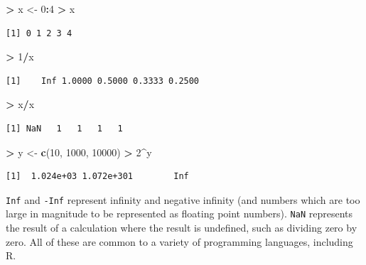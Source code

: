 \documentclass[]{krantz}
\makeatletter
\newenvironment{Shaded}{\begin{snugshade}}{\end{snugshade}}
\newcommand{\KeywordTok}[1]{\textcolor[rgb]{0.27,0.27,0.27}{\textbf{#1}}}
\newcommand{\DecValTok}[1]{\textcolor[rgb]{0.06,0.06,0.06}{#1}}
\newcommand{\StringTok}[1]{\textcolor[rgb]{0.5,0.5,0.5}{#1}}
\newcommand{\OperatorTok}[1]{\textcolor[rgb]{0.43,0.43,0.43}{\textbf{#1}}}
\newcommand{\NormalTok}[1]{#1}
\newenvironment{kframe}{%
\medskip{}
\setlength{\fboxsep}{.8em}
 \def\at@end@of@kframe{}%
 \ifinner\ifhmode%
  \def\at@end@of@kframe{\end{minipage}}%
  \begin{minipage}{\columnwidth}%
 \fi\fi%
 \def\FrameCommand##1{\hskip\@totalleftmargin \hskip-\fboxsep
 \colorbox{shadecolor}{##1}\hskip-\fboxsep
     \hskip-\linewidth \hskip-\@totalleftmargin \hskip\columnwidth}%
 \MakeFramed {\advance\hsize-\width
   \@totalleftmargin\z@ \linewidth\hsize
   \@setminipage}}%
 {\par\unskip\endMakeFramed%
 \at@end@of@kframe}
\renewenvironment{Shaded}{\begin{kframe}}{\end{kframe}}
\theoremstyle{definition}
\theoremstyle{definition}
\theoremstyle{definition}
\theoremstyle{remark}
\makeatother
\begin{document}
\begin{Shaded}
\begin{Highlighting}[]
\OperatorTok{>}\StringTok{ }\NormalTok{x <-}\StringTok{ }\DecValTok{0}\OperatorTok{:}\DecValTok{4}
\OperatorTok{>}\StringTok{ }\NormalTok{x}
\end{Highlighting}
\end{Shaded}

\begin{verbatim}
[1] 0 1 2 3 4
\end{verbatim}

\begin{Shaded}
\begin{Highlighting}[]
\OperatorTok{>}\StringTok{ }\DecValTok{1}\OperatorTok{/}\NormalTok{x}
\end{Highlighting}
\end{Shaded}

\begin{verbatim}
[1]    Inf 1.0000 0.5000 0.3333 0.2500
\end{verbatim}

\begin{Shaded}
\begin{Highlighting}[]
\OperatorTok{>}\StringTok{ }\NormalTok{x}\OperatorTok{/}\NormalTok{x}
\end{Highlighting}
\end{Shaded}

\begin{verbatim}
[1] NaN   1   1   1   1
\end{verbatim}

\begin{Shaded}
\begin{Highlighting}[]
\OperatorTok{>}\StringTok{ }\NormalTok{y <-}\StringTok{ }\KeywordTok{c}\NormalTok{(}\DecValTok{10}\NormalTok{, }\DecValTok{1000}\NormalTok{, }\DecValTok{10000}\NormalTok{)}
\OperatorTok{>}\StringTok{ }\DecValTok{2}\OperatorTok{^}\NormalTok{y}
\end{Highlighting}
\end{Shaded}

\begin{verbatim}
[1]  1.024e+03 1.072e+301        Inf
\end{verbatim}

\texttt{Inf} and \texttt{-Inf} represent infinity and negative infinity
(and numbers which are too large in magnitude to be represented as
floating point numbers). \texttt{NaN} represents the result of a
calculation where the result is undefined, such as dividing zero by
zero. All of these are common to a variety of programming languages,
including R.
\end{document}
